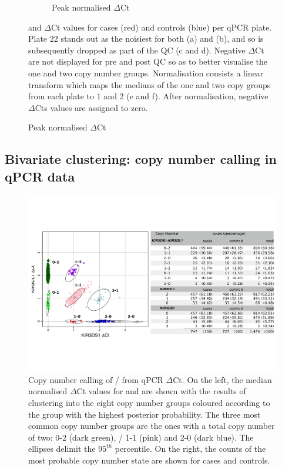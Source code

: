 \begin{figure}[!h]
\begin{subfigure}[b]{.4\textwidth}
    \caption{Peak normalised  $\Delta$Ct}
    \label{Figure-S1:f}
    \end{subfigure}
    {  and  $\Delta$Ct values for cases (red) and controls (blue) per qPCR plate.  }
    {
      Plate 22 stands out as the noisiest for both  (a) and  (b), and so is subsequently dropped as part of the QC (c and d).
      Negative $\Delta$Ct are not displayed for pre and post QC so as to better visualise the one and two copy number groups.
      Normalisation consists a linear transform which maps the medians of the one and two copy groups from each plate to 1 and 2 (e and f).
      After normalisation, negative $\Delta$Cts values are assigned to zero.
    }
\end{figure}

\subsection{Bivariate clustering: copy number calling in qPCR data}


\begin{figure}[h!]
  \centering
  \includegraphics[scale=.5]{KIR/figures/Figure-1.pdf}
  {Copy number calling of / from qPCR $\Delta$Ct.}
  { On the left, the median normalised $\Delta$Ct values for  and
   are shown with the results of clustering into the eight
  copy number groups coloured according to the group with the
  highest posterior probability.  The three most common copy number groups are the
  ones with a total copy number of two:  0-2 (dark green),
  / 1-1 (pink) and  2-0 (dark
  blue).  The ellipses delimit the $95^{th}$ percentile.  On the right, the
  counts of the most probable copy number state are shown for cases and
  controls.}
\end{figure} 

